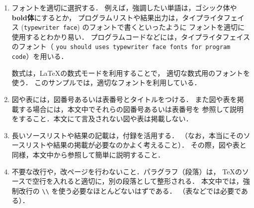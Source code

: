 \documentclass{jarticle}[11pt]
\begin{document}
\begin{enumerate}
    \item フォントを適切に選択する．
    例えば，強調したい単語は，{\gt ゴシック体}や{\gt \bf bold体}にするとか，
    プログラムリストや結果出力は，タイプライタフェイス
    (\verb|typewriter face|) のフォントで書くといったように
    フォントを適切に使用するとわかり易い．
    プログラムコードなどには，タイプライタフェイスのフォント（
    \verb|you should uses typewriter face fonts for program code|）を用いる．
     
    数式は，\LaTeX の数式モードを利用することで，
    適切な数式用のフォントを使う．
    このサンプルでは，適切なフォントを利用している．
     
    \item 図や表には，図番号あるいは表番号とタイトルをつける．
    また図や表を掲載する場合には，本文中でそれらの図番号あるいは表番号を
    参照して説明をすること．本文にて言及されない図や表は掲載しない．
     
    \item 長いソースリストや結果の記載は，付録を活用する．
    （なお，本当にそのソースリストや結果の掲載が必要なのかよく考えること）．
    その際，図や表と同様，本文中から参照して簡単に説明すること．
     
    \item 不要な改行や，改ページを行わないこと．パラグラフ（段落）は，
    TeXのソースで空行を入れると適切に，別の段落として整形される．
    本文中では，強制改行の \verb|\\| を使う必要なほとんどないはずである．
    （表などでは必要である）．
     
    \end{enumerate}
     
\end{document}
